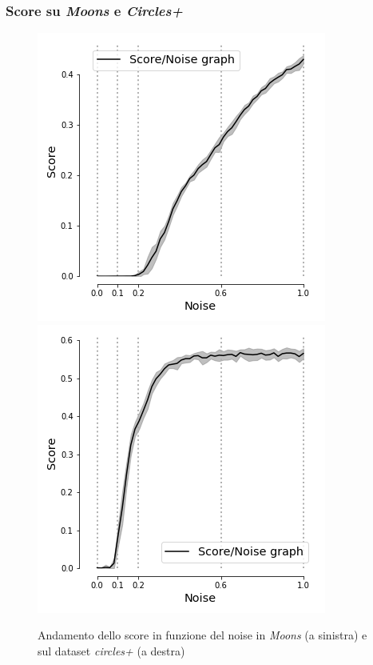 \documentclass{beamer}
\begin{document}
\begin{frame}
 \frametitle{Score su \textit{Moons} e \textit{Circles+}}
  \begin{figure}[H]
   \includegraphics[scale = 0.4]{images/score_noise_moons.png}
   \includegraphics[scale = 0.4]{images/score_noise_circles+.png}
   \caption{Andamento dello score in funzione del noise in \textit{Moons} (a sinistra) e sul dataset \textit{circles+} (a destra)}
    \end{figure}

\end{frame}
\end{document}
